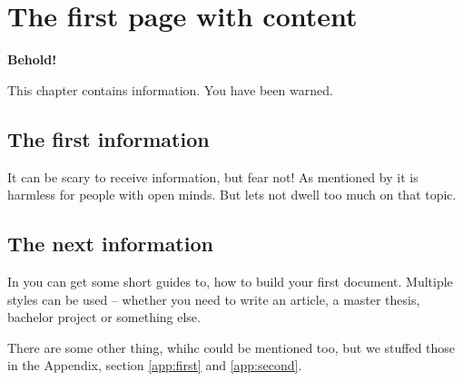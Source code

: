 
\section{The first page with content}

\textbf{Behold!}

This chapter contains information.
You have been warned.


\subsection{The first information}

It can be scary to receive information, but fear not!
As mentioned by \cite{dummy2015} it is harmless for people with open minds.
But lets not dwell too much on that topic. 



\subsection{The next information}

In \citep{LatexModulesLink} you can get some short guides to, how to build your first document.
Multiple styles can be used -- whether you need to write an article, a master thesis, bachelor project or something else.

There are some other thing, whihc could be mentioned too, but we stuffed those in the Appendix, section \ref{app:first} and \ref{app:second}.
